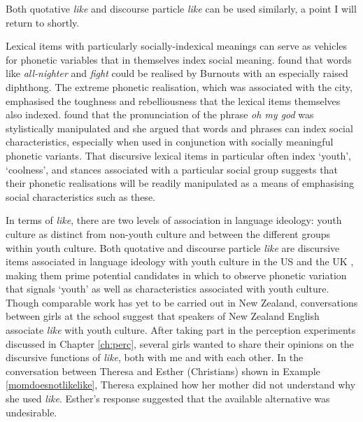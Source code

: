 \noindent Both quotative \textit{like} and discourse particle \textit{like} can be used similarly, a point I will return to shortly.

Lexical items with particularly socially-indexical meanings can serve as vehicles for phonetic variables that in themselves index social meaning. \citet{eckert1996} found that words like \textit{all-nighter} and \textit{fight} could be realised by Burnouts with an especially raised  diphthong. The extreme phonetic realisation, which was associated with the city, emphasised the toughness and rebelliousness that the lexical items themselves also indexed. \citet{chun2007} found that the pronunciation of the phrase \textit{oh my god} was stylistically manipulated and she argued that words and phrases can index social characteristics, especially when used in conjunction with socially meaningful phonetic variants. That discursive lexical items in particular often index `youth', `coolness', and stances associated with a particular social group suggests that their phonetic realisations will be readily manipulated as a means of emphasising social characteristics such as these.







In terms of \textit{like}, there are two levels of association in language ideology: youth culture as distinct from non-youth culture and between the different groups within youth culture. Both quotative and discourse particle \textit{like} are discursive items associated in language ideology with youth culture in the US and the UK \citep{daileyocain2000,buchstaller2006}, making them prime potential candidates in which to observe phonetic variation that signals `youth' as well as characteristics associated with youth culture. Though comparable work has yet to be carried out in New Zealand, conversations between girls at the school suggest that speakers of New Zealand English associate \textit{like} with youth culture. After taking part in the perception experiments discussed in Chapter \ref{ch:perc}, several girls wanted to share their opinions on the discursive functions of \textit{like}, both with me and with each other. In the conversation between Theresa and Esther (Christians) shown in Example \ref{momdoesnotlikelike}, Theresa explained how her mother did not understand why she used \textit{like}. Esther's response suggested that the available alternative was undesirable.




